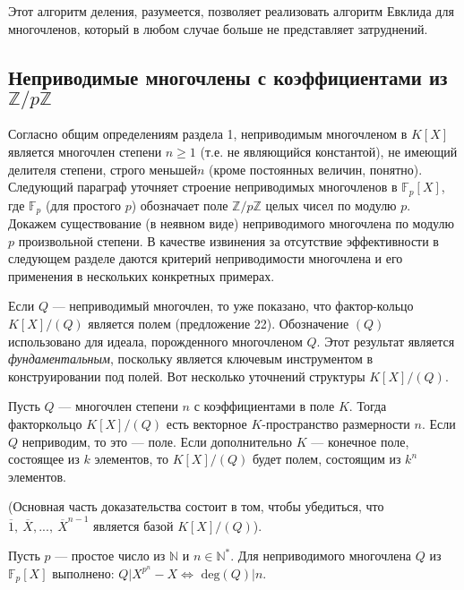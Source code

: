 Этот алгоритм деления, разумеется, позволяет реализовать  
алгоритм Евклида для многочленов, который в любом случае больше не 
представляет затруднений. 
\subsection{Неприводимые многочлены с коэффициентами из $\mathbb{Z}\slash p\mathbb{Z}$} 
Согласно общим определениям раздела 1, неприводимым многочленом 
в $K[X]$ является многочлен степени $n\geqslant 1$ (т.е. не являющийся  
константой), не имеющий делителя степени, строго меньшей$n$ (кроме  
постоянных величин, понятно). Следующий параграф уточняет строение 
неприводимых многочленов в $\mathbb{F}_p[X]$, где $\mathbb{F}_p$ (для простого $p$) обозначает 
поле \linebreak$\mathbb{Z}\slash p\mathbb{Z}$ целых чисел по модулю $p$. Докажем существование (в неявном 
виде) неприводимого многочлена по модулю $p$ произвольной степени. 
В качестве извинения за отсутствие эффективности в следующем  
разделе даются критерий неприводимости многочлена и его применения в 
нескольких конкретных примерах. 

Если $Q$ — неприводимый многочлен, то уже показано, что фактор-кольцо\linebreak
$K[X]\slash(Q)$ является полем (предложение 22). Обозначение $(Q)$  
использовано для идеала, порожденного многочленом $Q$. Этот результат 
является \textit{фундаментальным}, поскольку является ключевым  
инструментом в конструировании под полей. Вот несколько уточнений структуры 
$K[X]\slash(Q)$. 

\begin{predl}
\hspace*{15pt}Пусть $Q$ — многочлен степени $n$ с коэффициентами в поле $K$. Тогда 
факторкольцо $K[X]\slash(Q)$ есть векторное $K$-пространство размерности 
$n$. Если $Q$ неприводим, то это — поле. Если дополнительно $K$ —  
конечное поле, состоящее из $k$ элементов, то $K[X]\slash(Q)$ будет полем,  
состоящим из $k^n$ элементов.
\end{predl}

(Основная часть доказательства состоит в том, чтобы убедиться, 
что\linebreak $\overline{1},\: \overline{X},...,\: \overline{X}^{n-1}\text{ является базой }K[X]\slash(Q)$).

\begin{thm}
\hspace*{15pt}Пусть $p$ — простое число из $\mathbb{N}$ и $ n \in \mathbb{N}^*$. Для неприводимого 
многочлена $Q$ из $\mathbb{F}_p[X]$ выполнено: $Q | X^{p^n} - X \Leftrightarrow$ $\text{deg}(Q) | n$.
\end{thm} 
\pagebreak

